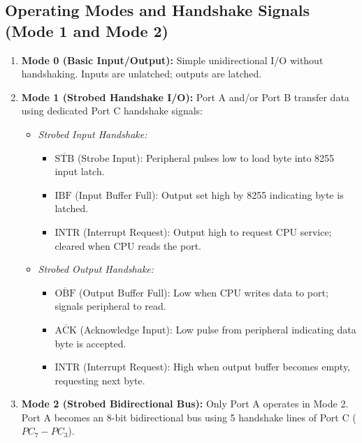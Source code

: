 \documentclass[12pt,a4paper]{article}
\begin{document}
\subsection{Operating Modes and Handshake Signals (Mode 1 and Mode 2)}
\begin{enumerate}[leftmargin=*]
  \item \textbf{Mode 0 (Basic Input/Output):} Simple unidirectional I/O without handshaking. Inputs are unlatched; outputs are latched.
  \item \textbf{Mode 1 (Strobed Handshake I/O):} Port A and/or Port B transfer data using dedicated Port C handshake signals:
  \begin{itemize}[leftmargin=*]
    \item \textit{Strobed Input Handshake:}
    \begin{itemize}[leftmargin=*]
      \item $\overline{\mathrm{STB}}$ (Strobe Input): Peripheral pulses low to load byte into 8255 input latch.
      \item $\mathrm{IBF}$ (Input Buffer Full): Output set high by 8255 indicating byte is latched.
      \item $\mathrm{INTR}$ (Interrupt Request): Output high to request CPU service; cleared when CPU reads the port.
    \end{itemize}
    \item \textit{Strobed Output Handshake:}
    \begin{itemize}[leftmargin=*]
      \item $\overline{\mathrm{OBF}}$ (Output Buffer Full): Low when CPU writes data to port; signals peripheral to read.
      \item $\overline{\mathrm{ACK}}$ (Acknowledge Input): Low pulse from peripheral indicating data byte is accepted.
      \item $\mathrm{INTR}$ (Interrupt Request): High when output buffer becomes empty, requesting next byte.
    \end{itemize}
  \end{itemize}
  \item \textbf{Mode 2 (Strobed Bidirectional Bus):} Only Port A operates in Mode 2. Port A becomes an 8-bit bidirectional bus using 5 handshake lines of Port C ($PC_7-PC_3$).
\end{enumerate}
\end{document}

